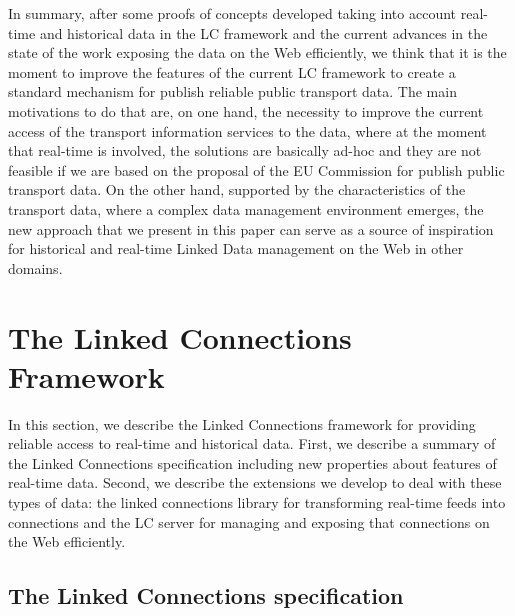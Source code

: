 \documentclass[sw]{iosart2x}
\begin{document}
In summary, after some proofs of concepts developed taking into account real-time and historical data in the LC framework and the current advances in the state of the work exposing the data on the Web efficiently, we think that it is the moment to improve the features of the current LC framework to create a standard mechanism for publish reliable public transport data. The main motivations to do that are, on one hand, the necessity to improve the current access of the transport information services to the data, where at the moment that real-time is involved, the solutions are basically ad-hoc and they are not feasible if we are based on the proposal of the EU Commission for publish public transport data. On the other hand, supported by the characteristics of the transport data, where a complex data management environment emerges, the new approach that we present in this paper can serve as a source of inspiration for historical and real-time Linked Data management on the Web in other domains.



\section{The Linked Connections Framework}
In this section, we describe the Linked Connections framework for providing reliable access to real-time and historical data. First, we describe a summary of the Linked Connections specification including new properties about features of real-time data. Second, we describe the extensions we develop to deal with these types of data: the linked connections library for transforming real-time feeds into connections and the LC server for managing and exposing that connections on the Web efficiently.

\subsection{The Linked Connections specification}
\end{document}
